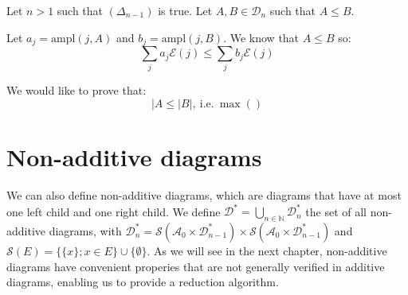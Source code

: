 \noindent{} Let $n > 1$ such that $(\Delta_{n-1})$ is true. Let $A, B \in \mathcal{D}_n$ such that $A \le B$.


Let $a_j = \text{ampl}(j, A)$ and $b_j = \text{ampl}(j, B)$. We know that $A \le B$ so:
$$\sum_j a_j \mathcal{E}(j) \le \sum_j b_j \mathcal{E}(j)$$

We would like to prove that:
$$|A \le |B|, ~\text{i.e.}~ \max()$$

\section{Non-additive diagrams}

We can also define non-additive diagrams, which are diagrams that have at most one left child and one right child. We define $\mathcal{D}^* = \bigcup_{n \in \mathbb{N}} \mathcal{D}^*_n$ the set of all non-additive diagrams, with $\mathcal{D}^*_n = \mathscr{S}(\mathcal{A}_0 \times \mathcal{D}^*_{n-1}) \times \mathscr{S}(\mathcal{A}_0 \times \mathcal{D}^*_{n-1})$ and $\mathscr{S}(E) = \{ \{x\} ; x \in E\} \cup \{\emptyset\}$. As we will see in the next chapter, non-additive diagrams have convenient properies that are not generally verified in additive diagrams, enabling us to provide a reduction algorithm.

